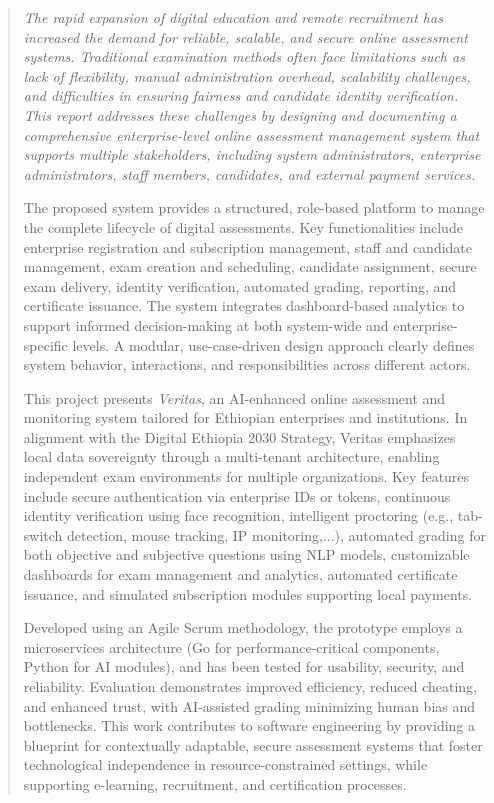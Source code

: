 {}
\begin{abstract}
\sloppy\itshape
The rapid expansion of digital education and remote recruitment has increased the demand for reliable, scalable, and secure online assessment systems. Traditional examination methods often face limitations such as lack of flexibility, manual administration overhead, scalability challenges, and difficulties in ensuring fairness and candidate identity verification. This report addresses these challenges by designing and documenting a comprehensive enterprise-level online assessment management system that supports multiple stakeholders, including system administrators, enterprise administrators, staff members, candidates, and external payment services.

The proposed system provides a structured, role-based platform to manage the complete lifecycle of digital assessments. Key functionalities include enterprise registration and subscription management, staff and candidate management, exam creation and scheduling, candidate assignment, secure exam delivery, identity verification, automated grading, reporting, and certificate issuance. The system integrates dashboard-based analytics to support informed decision-making at both system-wide and enterprise-specific levels. A modular, use-case-driven design approach clearly defines system behavior, interactions, and responsibilities across different actors.

This project presents \textit{Veritas}, an AI-enhanced online assessment and monitoring system tailored for Ethiopian enterprises and institutions. In alignment with the Digital Ethiopia 2030 Strategy, Veritas emphasizes local data sovereignty through a multi-tenant architecture, enabling independent exam environments for multiple organizations. Key features include secure authentication via enterprise IDs or tokens, continuous identity verification using face recognition, intelligent proctoring (e.g., tab-switch detection, mouse tracking, IP monitoring,...), automated grading for both objective and subjective questions using NLP models, customizable dashboards for exam management and analytics, automated certificate issuance, and simulated subscription modules supporting local payments.

Developed using an Agile Scrum methodology, the prototype employs a microservices architecture (Go for performance-critical components, Python for AI modules), and has been tested for usability, security, and reliability. Evaluation demonstrates improved efficiency, reduced cheating, and enhanced trust, with AI-assisted grading minimizing human bias and bottlenecks. This work contributes to software engineering by providing a blueprint for contextually adaptable, secure assessment systems that foster technological independence in resource-constrained settings, while supporting e-learning, recruitment, and certification processes.


\end{abstract}
